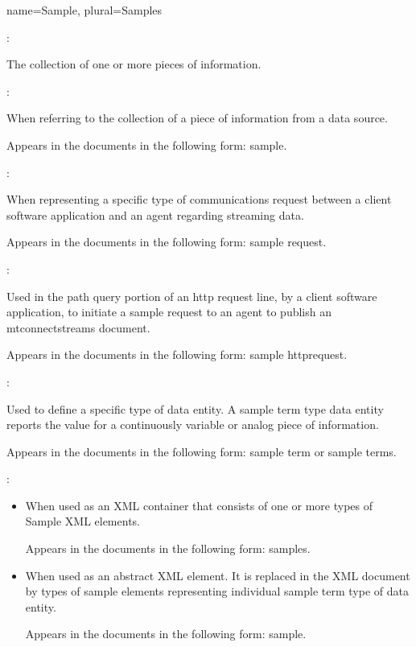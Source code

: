 {
  name={Sample},
  plural={Samples}
}
{
	:

	The collection of one or more pieces of information.  

	:

	When referring to the collection of a piece of information from a data source.

	Appears in the documents in the following form: sample.

	:

	When representing a specific type of communications request between a client software application and an \gls{agent} regarding \gls{streaming data}.  

	Appears in the documents in the following form: \gls{sample request}.

	:

	Used in the \gls{path query} portion of an \gls{http request line}, by a client software application, to initiate a \gls{sample request} to an \gls{agent} to publish an \gls{mtconnectstreams} document.

	Appears in the documents in the following form: \gls{sample httprequest}.

	:

	Used to define a specific type of \gls{data entity}.  A \gls{sample term} type \gls{data entity} reports the value for a continuously variable or analog piece of information.

	Appears in the documents in the following form: \gls{sample term} or \glspl{sample term}.

	:

    \begin{itemize}
	\item When used as an XML container that consists of one or more types of Sample XML elements.

	Appears in the documents in the following form: \gls{samples}.

	\item When used as an abstract XML element.  It is replaced in the XML document by types of \gls{sample} elements representing individual \gls{sample term} type of \gls{data entity}.

	Appears in the documents in the following form: \gls{sample}.
    \end{itemize}
}


